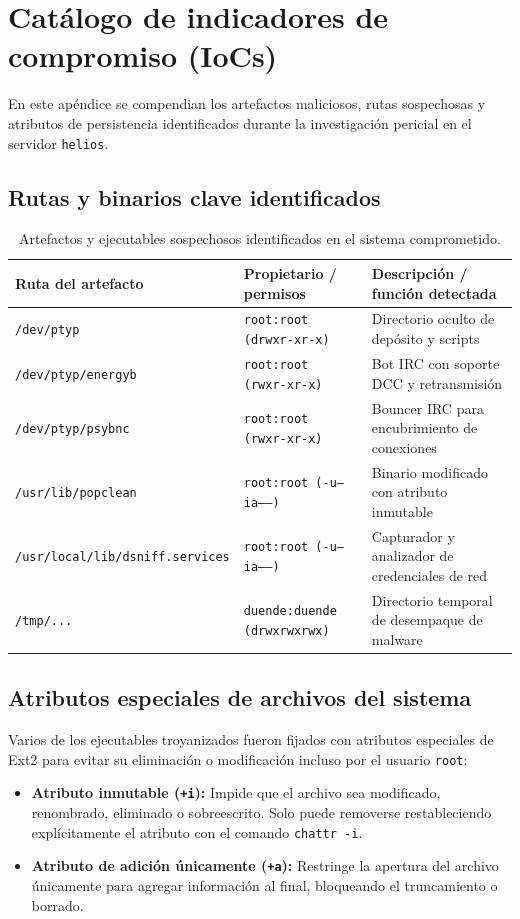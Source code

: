 \chapter{Catálogo de indicadores de compromiso (IoCs)}

En este apéndice se compendian los artefactos maliciosos, rutas sospechosas y atributos de persistencia identificados durante la investigación pericial en el servidor \texttt{helios}.

\section{Rutas y binarios clave identificados}

\begin{table}[h!]
\centering
\footnotesize
\begin{tabularx}{\textwidth}{@{} l l X @{}}
\toprule
\textbf{Ruta del artefacto} & \textbf{Propietario / permisos} & \textbf{Descripción / función detectada} \\
\midrule
\texttt{/dev/ptyp} & \texttt{root:root (drwxr-xr-x)} & Directorio oculto de depósito y scripts \\
\texttt{/dev/ptyp/energyb} & \texttt{root:root (rwxr-xr-x)} & Bot IRC con soporte DCC y retransmisión \\
\texttt{/dev/ptyp/psybnc} & \texttt{root:root (rwxr-xr-x)} & Bouncer IRC para encubrimiento de conexiones \\
\texttt{/usr/lib/popclean} & \texttt{root:root (-u--ia-----)} & Binario modificado con atributo inmutable \\
\texttt{/usr/local/lib/dsniff.services} & \texttt{root:root (-u--ia-----)} & Capturador y analizador de credenciales de red \\
\texttt{/tmp/...} & \texttt{duende:duende (drwxrwxrwx)} & Directorio temporal de desempaque de malware \\
\bottomrule
\end{tabularx}
\caption{Artefactos y ejecutables sospechosos identificados en el sistema comprometido.}
\end{table}

\section{Atributos especiales de archivos del sistema}

Varios de los ejecutables troyanizados fueron fijados con atributos especiales de Ext2 para evitar su eliminación o modificación incluso por el usuario \texttt{root}:
\begin{itemize}
    \item \textbf{Atributo inmutable (\texttt{+i}):} Impide que el archivo sea modificado, renombrado, eliminado o sobreescrito. Solo puede removerse restableciendo explícitamente el atributo con el comando \texttt{chattr -i}.
    \item \textbf{Atributo de adición únicamente (\texttt{+a}):} Restringe la apertura del archivo únicamente para agregar información al final, bloqueando el truncamiento o borrado.
\end{itemize}
